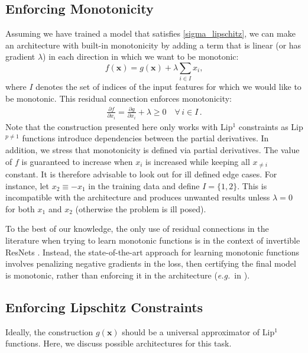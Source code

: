 \documentclass{article}
\begin{document}
\subsection{Enforcing Monotonicity} 
Assuming we have trained a model that satisfies \eqref{sigma_lipschitz}, 
we can make
an architecture with built-in monotonicity by adding a term that is linear (or has
gradient $\lambda$) in each direction in which we want to be monotonic:
\begin{equation} \label{eqn:monotonic_function}
f(\bm{x}) = g(\bm{x}) + \lambda\sum_{i \in I} x_i,
\end{equation} 
where $I$ denotes the set of indices of the input features for which we would like to be monotonic. This residual connection enforces monotonicity:
\begin{align}
\frac{\partial f}{\partial x_i} = \frac{\partial g}{\partial x_i} + \lambda \geq 0 \quad \forall \, i \in I \,.
\end{align}
Note that the construction presented here only works with Lip$^1$ constraints
as Lip$^{p\neq1}$ functions introduce dependencies between the partial derivatives.
In addition, we stress that  monotonicity is defined via partial derivatives. The value of $f$ is guaranteed to increase when $x_i$ is increased while keeping all $x_{\neq i}$ constant. It is therefore advisable to look out for ill defined edge cases. For instance, let $x_2 \equiv -x_1$ in the training data and define $I = \{1,2\}$. This is incompatible with the architecture and produces unwanted results unless $\lambda=0$ for both $x_1$ and $x_2$ (otherwise the problem is ill posed).

To the best of our knowledge, the only use of residual connections in the literature when trying
to learn monotonic functions is in the context of invertible ResNets \cite{behrmann2019invertible}.
Instead, the state-of-the-art approach for learning monotonic functions involves penalizing negative
gradients in the loss, then certifying the final model is monotonic,
rather than enforcing it in the architecture ({\em e.g.}\ in \cite{liu2020certified}).  


\subsection{Enforcing Lipschitz Constraints} %

Ideally, the construction $g(\bm{x})$ should be a universal approximator of Lip$^1$ functions.
Here, we discuss possible architectures for this task.
\end{document}
